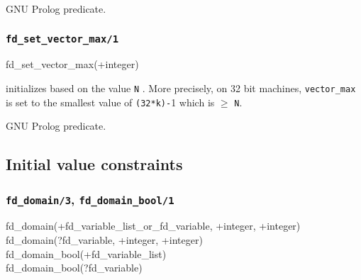 \begin{PlErrors}


\end{PlErrors}

\Portability

GNU Prolog predicate.

\subsubsection{\texttt{fd\_set\_vector\_max/1}}
\label{fd-set-vector-max/1}

\begin{TemplatesOneCol}
fd\_set\_vector\_max(+integer)

\end{TemplatesOneCol}

\Description

 initializes  based on
the value \texttt{N} . More precisely, on 32 bit
machines, \texttt{vector\_max} is set to the smallest value of
\texttt{(32*k)-}1 which is $\geq$ \texttt{N}.

\begin{PlErrors}




\end{PlErrors}

\Portability

GNU Prolog predicate.

\subsection{Initial value constraints}

\subsubsection{\texttt{fd\_domain/3},
\texttt{fd\_domain\_bool/1}}

\begin{TemplatesOneCol}
fd\_domain(+fd\_variable\_list\_or\_fd\_variable, +integer,
+integer)\\
fd\_domain(?fd\_variable, +integer, +integer)\\
fd\_domain\_bool(+fd\_variable\_list)\\
fd\_domain\_bool(?fd\_variable)

\end{TemplatesOneCol}


